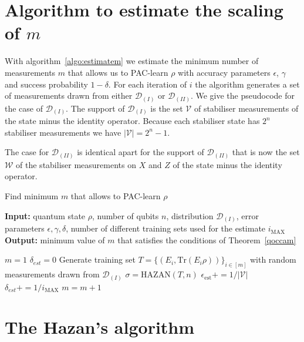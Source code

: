 \documentclass[aps,superscriptaddress,nofootinbib,twocolumn]{revtex4-1}
\begin{document}
\begin{widetext}
\section{Algorithm to estimate the scaling of $m$}

With algorithm~\ref{algo:estimatem} we estimate the minimum number of measurements $m$ that allows us to PAC-learn $\rho$ with accuracy parameters $\epsilon$, $\gamma$ and success probability $1-\delta$. For each iteration of $i$ the algorithm generates a set of measurements drawn from either $\mathcal{D}_{(I)}$ or $\mathcal{D}_{(II)}$. We give the pseudocode for the case of $\mathcal{D}_{(I)}$. The support of $\mathcal{D}_{(I)}$ is the set $\mathcal{V}$ of stabiliser measurements of the state minus the identity operator. Because each stabiliser state has $2^n$ stabiliser measurements we have  $|\mathcal{V}| = 2^{n}-1$. 

The case for $\mathcal{D}_{(II)}$ is identical apart for  the support of $\mathcal{D}_{(II)}$ that is now  the set $\mathcal{W}$ of the stabiliser measurements on $X$ and $Z$ of the state minus the identity operator. 

\begin{algorithm}[H]
\caption{Find minimum $m$ that allows to PAC-learn $\rho$}
\label{algo:estimatem}
\textbf{Input:} quantum state $\rho$, number of qubits $n$, distribution $\mathcal{D}_{(I)}$, error parameters $\epsilon, \gamma, \delta $, number of different training sets used for the estimate $i_{\mathrm{MAX}}$ \\
\textbf{Output:} minimum value of $m$ that satisfies the conditions of Theorem~\ref{qoccam} \\
\begin{algorithmic}[1]
\State $m = 1$
\Repeat
\State $\delta_{est} =  0 $
\State Generate training set $T=\{(E_i,\mathrm{Tr}(E_i\rho))\}_{i\in[m]}$ with random measurements drawn from $\mathcal{D}_{(I)}$
\State $\sigma = \mathrm{HAZAN}(T,n)$
				\State $\epsilon_{\mathrm{est}}  += 1/ |\mathcal{V}|$
			\EndIf
		\EndFor
	\State $\delta_{est} += 1/i_{\mathrm{MAX}}$
	\EndIf
\EndFor
\State $m = m + 1$
\end{algorithmic}
\end{algorithm}

\section{The Hazan's algorithm}


\end{widetext}
\end{document}
